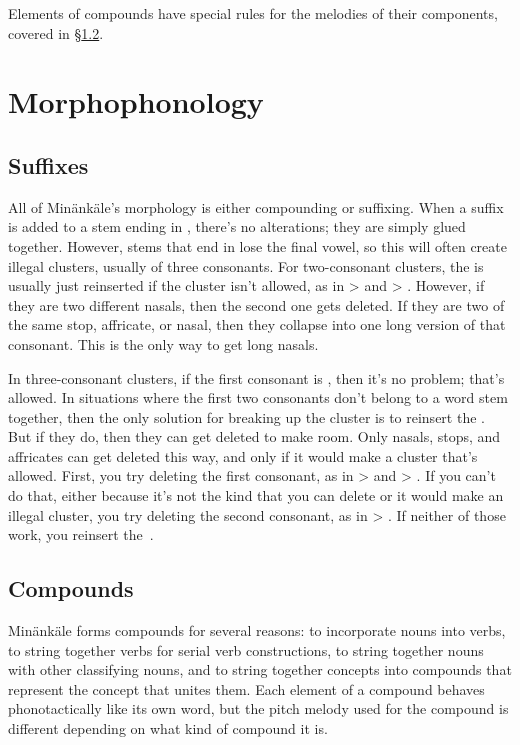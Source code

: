 \noindent Elements of compounds have special rules for the melodies of their
components, covered in \S\ref{s:compounds}.

\section{Morphophonology}
\subsection{Suffixes}
All of Min\"ank\"ale's morphology is either compounding or suffixing. When a
suffix is added to a stem ending in , there's no alterations; they
are simply glued together. However, stems that end in  lose the final
vowel, so this will often create illegal clusters, usually of three consonants.
For two-consonant clusters, the  is usually just reinserted if the
cluster isn't allowed, as in  >  and  >
. However, if they are two different nasals, then the second
one gets deleted. If they are two of the same stop, affricate, or nasal, then
they collapse into one long version of that consonant. This is the only way
to get long nasals.

In three-consonant clusters, if the first consonant is , then it's no
problem; that's allowed. In situations where the first two consonants don't
belong to a word stem together, then the only solution for breaking up the
cluster is to reinsert the . But if they do, then they can get deleted to
make room. Only nasals, stops, and affricates can get deleted this way, and only
if it would make a cluster that's allowed. First, you try deleting the first
consonant, as in  >  and  >
. If you can't do that, either because it's not the kind that you
can delete or it would make an illegal cluster, you try deleting the second
consonant, as in  > . If neither of those work, you
reinsert the~.

\subsection{Compounds}\label{s:compounds}
Min\"ank\"ale forms compounds for several reasons: to incorporate nouns into
verbs, to string together verbs for serial verb constructions, to string
together nouns with other classifying nouns, and to string together concepts
into compounds that represent the concept that unites them. Each element of a
compound behaves phonotactically like its own word, but the pitch melody used
for the compound is different depending on what kind of compound it is.

